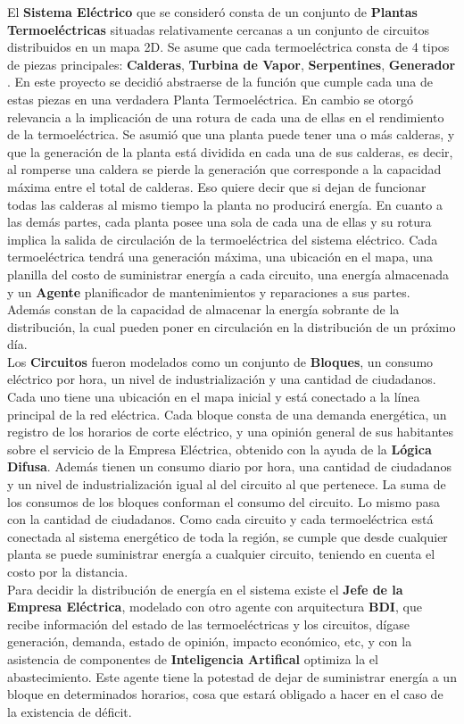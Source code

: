 \documentclass[twocolumn, fontsize=10pt]{article}
\begin{document}
El \textbf{Sistema Eléctrico} que se consideró consta de un conjunto de \textbf{Plantas Termoeléctricas}
situadas relativamente cercanas a un conjunto de circuitos distribuidos en un mapa 2D.
Se asume que cada termoeléctrica consta de 4 tipos de piezas principales:
\textbf{Calderas}, \textbf{Turbina de Vapor}, \textbf{Serpentines}, \textbf{Generador} \cite{parts}.
En este proyecto se decidió abstraerse de la función que cumple cada una de estas piezas
en una verdadera Planta Termoeléctrica. En cambio se otorgó relevancia a la implicación de
una rotura de cada una de ellas en el rendimiento de la termoeléctrica. Se asumió que una planta
 puede tener una o más calderas, y que la generación de la planta está dividida en cada una de sus calderas,
 es decir, al romperse una caldera se pierde la generación que corresponde a la capacidad máxima entre el total
 de calderas. Eso quiere decir que si dejan de funcionar todas las calderas al mismo tiempo la planta no producirá energía.
 En cuanto a las demás partes, cada planta posee una sola de cada una de ellas y su rotura implica la salida de circulación
 de la termoeléctrica del sistema eléctrico. Cada termoeléctrica tendrá una generación máxima, una ubicación en el mapa,
 una planilla del costo de suministrar energía a cada circuito, una energía almacenada y un \textbf{Agente} planificador de
 mantenimientos y reparaciones a sus partes. Además constan de la capacidad de almacenar la energía sobrante de la distribución, la cual pueden poner en circulación en la distribución de un próximo día.\\
 Los \textbf{Circuitos} fueron modelados como un conjunto de \textbf{Bloques}, un consumo eléctrico por hora, 
 un nivel de industrialización y una cantidad de ciudadanos. Cada uno tiene una ubicación en el mapa inicial y está conectado 
 a la línea principal de la red eléctrica. Cada bloque consta de una demanda energética, un registro de los horarios de corte 
 eléctrico, y una opinión general de sus habitantes sobre el servicio de la Empresa Eléctrica, obtenido con la ayuda de la \textbf{Lógica Difusa}. 
 Además tienen un consumo diario por hora, una cantidad de ciudadanos y un nivel de industrialización igual
 al del circuito al que pertenece. La suma de los consumos de los bloques conforman el consumo del circuito. 
 Lo mismo pasa con la cantidad de ciudadanos. Como cada circuito y cada termoeléctrica
 está conectada al sistema energético de toda la región, se cumple que desde cualquier planta se puede suministrar
 energía a cualquier circuito, teniendo en cuenta el costo por la distancia.\\
 Para decidir la distribución de energía en el sistema existe el \textbf{Jefe de la Empresa Eléctrica}, modelado con otro agente
 con arquitectura \textbf{BDI}, que recibe información del estado de las termoeléctricas y los circuitos, dígase generación, demanda, estado de opinión,
 impacto económico, etc, y con la asistencia de componentes de \textbf{Inteligencia Artifical} optimiza la el abastecimiento. Este agente
 tiene la potestad de dejar de suministrar energía a un bloque en determinados horarios, cosa que estará obligado a hacer en el caso de la 
 existencia de déficit.
\end{document}

